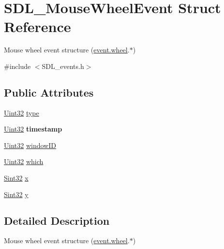 \hypertarget{structSDL__MouseWheelEvent}{}\section{S\+D\+L\+\_\+\+Mouse\+Wheel\+Event Struct Reference}
\label{structSDL__MouseWheelEvent}


Mouse wheel event structure (\hyperlink{unionSDL__Event_a267d3f550715519ec90a81ccd0e6cbda}{event.\+wheel}.$\ast$)  




{\ttfamily \#include $<$S\+D\+L\+\_\+events.\+h$>$}

\subsection*{Public Attributes}
\begin{DoxyCompactItemize}
\item 
\hyperlink{SDL__stdinc_8h_add440eff171ea5f55cb00c4a9ab8672d}{Uint32} \hyperlink{structSDL__MouseWheelEvent_aa6b741e99df708c6f9550ee0f520fb70}{type}
\item 
\hypertarget{structSDL__MouseWheelEvent_a83ad52c80ff49a8e75dc6c33bba65fa0}{}\hyperlink{SDL__stdinc_8h_add440eff171ea5f55cb00c4a9ab8672d}{Uint32} {\bfseries timestamp}\label{structSDL__MouseWheelEvent_a83ad52c80ff49a8e75dc6c33bba65fa0}

\item 
\hyperlink{SDL__stdinc_8h_add440eff171ea5f55cb00c4a9ab8672d}{Uint32} \hyperlink{structSDL__MouseWheelEvent_ab45eb1895217214ecb773fc555e08f6c}{window\+I\+D}
\item 
\hyperlink{SDL__stdinc_8h_add440eff171ea5f55cb00c4a9ab8672d}{Uint32} \hyperlink{structSDL__MouseWheelEvent_a014dc767d52e8b75ba26a5f12e1704e8}{which}
\item 
\hyperlink{SDL__stdinc_8h_a7a90b941db9d4582e9ad7abb9940ff7e}{Sint32} \hyperlink{structSDL__MouseWheelEvent_a6d904eef474ea45a5b1828fcb5b0f859}{x}
\item 
\hyperlink{SDL__stdinc_8h_a7a90b941db9d4582e9ad7abb9940ff7e}{Sint32} \hyperlink{structSDL__MouseWheelEvent_a53fdf77a464426bc8b30e629795f044b}{y}
\end{DoxyCompactItemize}


\subsection{Detailed Description}
Mouse wheel event structure (\hyperlink{unionSDL__Event_a267d3f550715519ec90a81ccd0e6cbda}{event.\+wheel}.$\ast$) 

